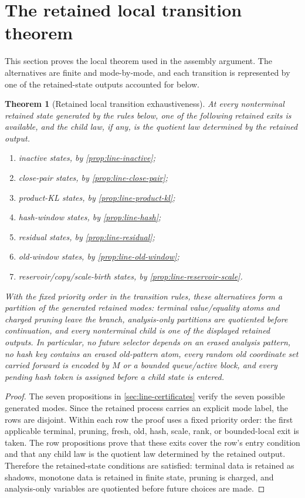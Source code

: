 \documentclass[11pt]{article}
\newcommand{\Cref}[1]{\ref{#1}}
\newtheorem{theorem}{Theorem}[section]
\theoremstyle{remark}
\begin{document}
\section{The retained local transition theorem}\label{sec:local-transition}

This section proves the local theorem used in the assembly argument.  The alternatives are finite and mode-by-mode, and each transition is represented by one of the retained-state outputs accounted for below.

\begin{theorem}[Retained local transition exhaustiveness]\label{thm:local-transition}
At every nonterminal retained state generated by the rules below, one of the following retained exits is available, and the child law, if any, is the quotient law determined by the retained output.
\begin{enumerate}[label=\textup{(\roman*)}]
\item inactive states, by \Cref{prop:line-inactive};
\item close-pair states, by \Cref{prop:line-close-pair};
\item product-KL states, by \Cref{prop:line-product-kl};
\item hash-window states, by \Cref{prop:line-hash};
\item residual states, by \Cref{prop:line-residual};
\item old-window states, by \Cref{prop:line-old-window};
\item reservoir/copy/scale-birth states, by \Cref{prop:line-reservoir-scale}.
\end{enumerate}
With the fixed priority order in the transition rules, these alternatives form a partition of the generated retained modes: terminal value/equality atoms and charged pruning leave the branch, analysis-only partitions are quotiented before continuation, and every nonterminal child is one of the displayed retained outputs.  In particular, no future selector depends on an erased analysis pattern, no hash key contains an erased old-pattern atom, every random old coordinate set carried forward is encoded by $M$ or a bounded queue/active block, and every pending hash token is assigned before a child state is entered.
\end{theorem}

\begin{proof}
The seven propositions in \Cref{sec:line-certificates} verify the seven possible generated modes.  Since the retained process carries an explicit mode label, the rows are disjoint.  Within each row the proof uses a fixed priority order: the first applicable terminal, pruning, fresh, old, hash, scale, rank, or bounded-local exit is taken.  The row propositions prove that these exits cover the row's entry condition and that any child law is the quotient law determined by the retained output.  Therefore the retained-state conditions are satisfied: terminal data is retained as shadows, monotone data is retained in finite state, pruning is charged, and analysis-only variables are quotiented before future choices are made.
\end{proof}
\end{document}
